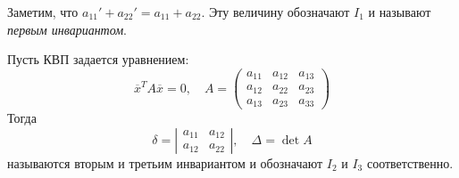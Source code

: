 \begin{Def}
	Заметим, что $a_{11}' + a_{22}' = a_{11} + a_{22}$.
	Эту величину обозначают $I_1$ и называют \textit{первым инвариантом}. 
\end{Def}

\begin{Thm}
	Пусть КВП задается уравнением:
	\begin{equation} \label{eq:conic_section}
		\overline{x}^T A \overline{x} = 0, \quad A = \left(\begin{array}{ccc}
	a_{11} & a_{12} & a_{13} \\ 
	a_{12} & a_{22} & a_{23} \\ 
	a_{13} & a_{23} & a_{33}
	\end{array}\right)
	\end{equation}
	Тогда
	\[\delta = \left|\begin{array}{cc}
	a_{11} & a_{12} \\ 
	a_{12} & a_{22}
	\end{array}\right|, \quad \Delta = \det A\]
	называются вторым и третьим инвариантом и обозначают $I_2$ и $I_3$ соответственно. 
\end{Thm}

